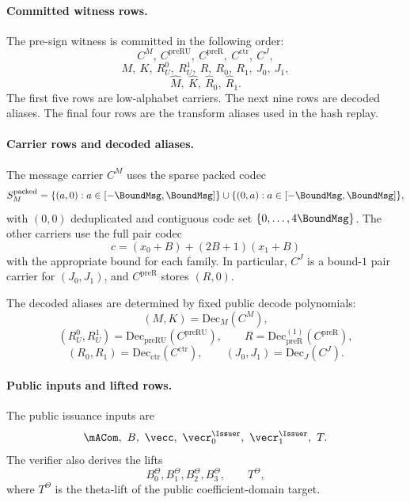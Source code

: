 \paragraph{Committed witness rows.}
The pre-sign witness is committed in the following order:
\[
  C^M,\ C^{\mathrm{preRU}},\ C^{\mathrm{preR}},\ C^{\mathrm{ctr}},\ C^J,
\]
\[
  M,\ K,\ R_U^0,\ R_U^1,\ R,\ R_0,\ R_1,\ J_0,\ J_1,
\]
\[
  \widehat M,\ \widehat K,\ \widehat R_0,\ \widehat R_1.
\]
The first five rows are low-alphabet carriers. The next nine rows are decoded
aliases. The final four rows are the transform aliases used in the hash replay.

\paragraph{Carrier rows and decoded aliases.}
The message carrier \(C^M\) uses the sparse packed codec
\[
S_M^{\mathrm{packed}}
=
\{(a,0):a\in[-\BoundMsg,\BoundMsg]\}
\cup
\{(0,a):a\in[-\BoundMsg,\BoundMsg]\},
\]
with \((0,0)\) deduplicated and contiguous code set
\(\{0,\dots,4\BoundMsg\}\). The other carriers use the full pair codec
\[
  c=(x_0+B)+(2B+1)(x_1+B)
\]
with the appropriate bound for each family. In particular, \(C^J\) is a
bound-\(1\) pair carrier for \((J_0,J_1)\), and
\(C^{\mathrm{preR}}\) stores \((R,0)\).

The decoded aliases are determined by fixed public decode polynomials:
\[
  (M,K)=\mathrm{Dec}_M(C^M),
\]
\[
  (R_U^0,R_U^1)=\mathrm{Dec}_{\mathrm{preRU}}(C^{\mathrm{preRU}}),\qquad
  R=\mathrm{Dec}^{(1)}_{\mathrm{preR}}(C^{\mathrm{preR}}),
\]
\[
  (R_0,R_1)=\mathrm{Dec}_{\mathrm{ctr}}(C^{\mathrm{ctr}}),\qquad
  (J_0,J_1)=\mathrm{Dec}_J(C^J).
\]

\paragraph{Public inputs and lifted rows.}
The public issuance inputs are
\[
  \mACom,\ B,\ \vecc,\ \vecr_0^{\Issuer},\ \vecr_1^{\Issuer},\ T.
\]
The verifier also derives the lifts
\[
  B_0^\Theta,B_1^\Theta,B_2^\Theta,B_3^\Theta,\qquad T^\Theta,
\]
where \(T^\Theta\) is the theta-lift of the public coefficient-domain target.

